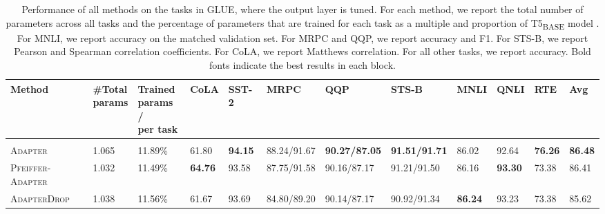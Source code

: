 \documentclass{article}
\newcommand{\basebase}{T5\textsubscript{\tiny BASE}\xspace}
\newcommand{\adapter}{\textsc{Adapter}\xspace}
\newcommand{\pfeifferadapter}{\textsc{Pfeiffer-Adapter}\xspace}
\newcommand{\adapterdrop}{\textsc{AdapterDrop}\xspace}
\begin{document}
\begin{table}[H]
\centering 
\caption{Performance of all methods on the tasks in GLUE, where the output layer is tuned. For each method, we report the total number of parameters across all tasks and the percentage of parameters that are trained for each task as a multiple and proportion of \basebase model \citep{raffel2019exploring}.
For MNLI, we report accuracy on the matched validation set. For MRPC and QQP, we report accuracy and F1. For STS-B, we report Pearson and Spearman correlation coefficients. For CoLA, we report Matthews correlation. For all other tasks, we report accuracy. Bold fonts indicate the best results in each block.}
\begin{adjustbox}{max width=\textwidth}
\begin{tabular}{l@{\hskip 0.02in}|l@{\hskip 0.06in}l@{\hskip 0.0in}|l@{\hskip 0.08in}l@{\hskip 0.08in}l@{\hskip 0.08in}l@{\hskip 0.08in}l@{\hskip 0.08in}l@{\hskip 0.08in}l@{\hskip 0.08in}l|l}
\toprule %
\textbf{Method} & \pbox{3cm}{\textbf{\#Total}\\ \textbf{params}} & \pbox{3cm}{\textbf{Trained} \\ \textbf{params /}\\ \textbf{per task\vspace{0.1em}}} & \textbf{CoLA} &    \textbf{SST-2} &   \textbf{MRPC} &   \textbf{QQP} &     \textbf{STS-B} & \textbf{MNLI}  &    \textbf{QNLI} & \textbf{RTE} &   \textbf{Avg} \\
\toprule 
\rowcolor{gray!20}\multicolumn{12}{c}{\it \textbf{Baselines}}\\
\midrule 
\adapter& 1.065 & 11.89\% & 61.80 &  \textbf{94.15} &  88.24/91.67 &  \textbf{90.27/87.05} &  \textbf{91.51/91.71} &  86.02 &  92.64 &  \textbf{76.26} &  \textbf{86.48} \\ %
\pfeifferadapter &1.032 & 11.49\% & \textbf{64.76} &  93.58 &  87.75/91.58 &  90.16/87.17 &   91.21/91.50 &  86.16 &  \textbf{93.30} &  73.38 &  86.41 \\ %
\adapterdrop &1.038&11.56\%&61.67 &  93.69 &  84.80/89.20 &  90.14/87.17 &  90.92/91.34 &  \textbf{86.24} &  93.23 &  73.38 &  85.62 \\ %

\end{tabular}
\end{adjustbox}
\end{table}
\end{document}
